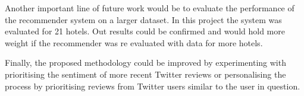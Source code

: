 Another important line of future work would be to evaluate the performance of the recommender system on a larger dataset. In this project the system was evaluated for 21 hotels. Out results could be confirmed and would hold more weight if the recommender was re evaluated with data for more hotels.

Finally, the proposed methodology could be improved by experimenting with prioritising the sentiment of more recent Twitter reviews or personalising the process by prioritising reviews from Twitter users similar to the user in question.

